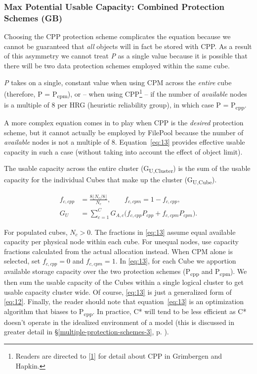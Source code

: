 \subsubsection*{Max Potential Usable Capacity: Combined Protection Schemes (GB)}

Choosing the CPP protection scheme complicates the equation because we cannot be guaranteed that \emph{all} objects will in fact be stored with CPP. As a result of this asymmetry we cannot treat \emph{P} as a single value because it is possible that there will be two data protection schemes employed within the same cube.

\emph{P} takes on a single, constant value when using CPM across the \emph{entire} cube (therefore, P = P\textsubscript{cpm}), or -- when using CPP\footnote{ Readers are directed to \hyperref[ref:1]{[1]} for detail about CPP in Grimbergen and Hapkin.} -- if the number of \emph{available} nodes is a multiple of 8 per HRG (heuristic reliability group), in which case P = P\textsubscript{cpp}.

A more complex equation comes in to play when CPP is the \emph{desired} protection scheme, but it cannot actually be employed by FilePool because the number of \emph{available} nodes is not a multiple of 8. Equation~\eqref{eq:13} provides effective usable capacity in such a case (without taking into account the effect of object limit).

The usable capacity across the entire cluster (G\textsubscript{U,Cluster}) is the sum of the usable capacity for the individual Cubes that make up the cluster (G\textsubscript{U,Cube}).


\nopagebreak
\begin{equation}\label{eq:13}
\begin{aligned}
f_{c,cpp}&=\frac{8\lfloor N_c/8\rfloor}{N_c},\qquad f_{c,cpm}=1-f_{c,cpp},\\
G_U&=\sum_{c=1}^{C}G_{A,c}\bigl(f_{c,cpp}P_{cpp}+f_{c,cpm}P_{cpm}\bigr).
\end{aligned}
\end{equation}
 

For populated cubes, \(N_c>0\). The fractions in \eqref{eq:13} assume equal available capacity per physical node within each cube. For unequal nodes, use capacity fractions calculated from the actual allocation instead. When CPM alone is selected, set \(f_{c,cpp}=0\) and \(f_{c,cpm}=1\). In \eqref{eq:13}, for each Cube we apportion available storage capacity over the two protection schemes (P\textsubscript{cpp} and P\textsubscript{cpm}). We then sum the usable capacity of the Cubes within a single logical cluster to get usable capacity cluster wide. Of course, \eqref{eq:13} is just a generalized form of \eqref{eq:12}. Finally, the reader should note that equation~\eqref{eq:13} is an optimization algorithm that biases to P\textsubscript{cpp}. In practice, C* will tend to be less efficient as C* doesn't operate in the idealized environment of a model (this is discussed in greater detail in §\ref{multiple-protection-schemes-3}, p. \pageref{multiple-protection-schemes-3}).

